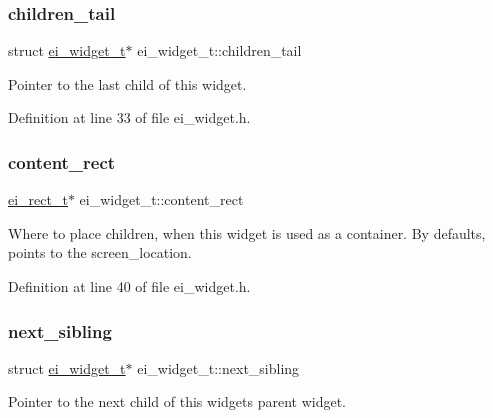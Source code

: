 \subsubsection{\texorpdfstring{children\+\_\+tail}{children\_tail}}
{\footnotesize\ttfamily struct \hyperlink{structei__widget__t}{ei\+\_\+widget\+\_\+t}$\ast$ ei\+\_\+widget\+\_\+t\+::children\+\_\+tail}



Pointer to the last child of this widget. 



Definition at line 33 of file ei\+\_\+widget.\+h.

\mbox{\label{structei__widget__t_a75c29d388a5f5b32cdd8a9c855bc2a75}} 
\subsubsection{\texorpdfstring{content\+\_\+rect}{content\_rect}}
{\footnotesize\ttfamily \hyperlink{structei__rect__t}{ei\+\_\+rect\+\_\+t}$\ast$ ei\+\_\+widget\+\_\+t\+::content\+\_\+rect}



Where to place children, when this widget is used as a container. By defaults, points to the screen\+\_\+location. 



Definition at line 40 of file ei\+\_\+widget.\+h.

\mbox{\label{structei__widget__t_ada15cedaf8e6e104a1461c1754ff6cb3}} 
\subsubsection{\texorpdfstring{next\+\_\+sibling}{next\_sibling}}
{\footnotesize\ttfamily struct \hyperlink{structei__widget__t}{ei\+\_\+widget\+\_\+t}$\ast$ ei\+\_\+widget\+\_\+t\+::next\+\_\+sibling}



Pointer to the next child of this widget\textquotesingle{}s parent widget. 



